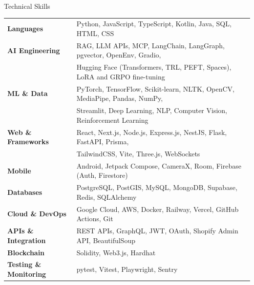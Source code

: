 \documentclass{resume} %
\begin{document}
\begin{rSection}{Technical Skills}

\begin{tabular}{ @{} >{\bfseries}l @{\hspace{6ex}} l }
Languages               & Python, JavaScript, TypeScript, Kotlin, Java, SQL, HTML, CSS \\
AI Engineering          & RAG, LLM APIs, MCP, LangChain, LangGraph, pgvector, OpenEnv, Gradio, \\
                        & Hugging Face (Transformers, TRL, PEFT, Spaces), LoRA and GRPO fine-tuning \\
ML \& Data              & PyTorch, TensorFlow, Scikit-learn, NLTK, OpenCV, MediaPipe, Pandas, NumPy, \\
                        & Streamlit, Deep Learning, NLP, Computer Vision, Reinforcement Learning \\
Web \& Frameworks       & React, Next.js, Node.js, Express.js, NestJS, Flask, FastAPI, Prisma, \\
                        & TailwindCSS, Vite, Three.js, WebSockets \\
Mobile                  & Android, Jetpack Compose, CameraX, Room, Firebase (Auth, Firestore) \\
Databases               & PostgreSQL, PostGIS, MySQL, MongoDB, Supabase, Redis, SQLAlchemy \\
Cloud \& DevOps         & Google Cloud, AWS, Docker, Railway, Vercel, GitHub Actions, Git \\
APIs \& Integration     & REST APIs, GraphQL, JWT, OAuth, Shopify Admin API, BeautifulSoup \\
Blockchain              & Solidity, Web3.js, Hardhat \\
Testing \& Monitoring   & pytest, Vitest, Playwright, Sentry \\
\end{tabular}\\

\end{rSection}

\end{document}
